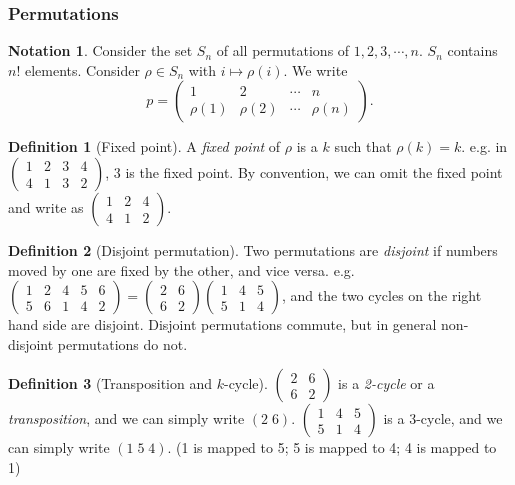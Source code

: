 \documentclass[a4paper]{article}
\theoremstyle{definition}
\newtheorem*{defi}{Definition}
\newtheorem*{notation}{Notation}
\begin{document}
\subsubsection{Permutations}

\begin{notation}
  Consider the set $S_n$ of all permutations of $1, 2, 3, \cdots , n$. $S_n$ contains $n!$ elements. Consider $\rho\in S_n$ with $i \mapsto \rho(i)$. We write
\[
p = \begin{pmatrix} 1 & 2 & \cdots & n\\ \rho(1) & \rho (2) &\cdots & \rho (n)\end{pmatrix}.
\]
\end{notation}

\begin{defi}[Fixed point]
  A \emph{fixed point} of $\rho$ is a $k$ such that $\rho(k) = k$. e.g. in $\begin{pmatrix} 1 & 2 & 3 & 4\\4 & 1 & 3 & 2\end{pmatrix}$, $3$ is the fixed point. By convention, we can omit the fixed point and write as $\begin{pmatrix} 1 & 2 & 4\\ 4 & 1 & 2\end{pmatrix}$.
\end{defi}

\begin{defi}[Disjoint permutation]
  Two permutations are \emph{disjoint} if numbers moved by one are fixed by the other, and vice versa.  e.g. $\begin{pmatrix} 1 & 2 & 4 & 5 & 6\\ 5 & 6 & 1 & 4 & 2\end{pmatrix} = \begin{pmatrix}2 & 6\\ 6& 2\end{pmatrix}\begin{pmatrix}1 & 4 & 5\\5 & 1 & 4\end{pmatrix}$, and the two cycles on the right hand side are disjoint. Disjoint permutations commute, but in general non-disjoint permutations do not.
\end{defi}

\begin{defi}[Transposition and $k$-cycle]
  $\begin{pmatrix} 2 & 6 \\ 6 & 2\end{pmatrix}$ is a \emph{2-cycle} or a \emph{transposition}, and we can simply write $(2\; 6)$. $\begin{pmatrix}1 & 4 & 5\\5 & 1 & 4\end{pmatrix}$ is a 3-cycle, and we can simply write $(1\; 5\; 4)$. (1 is mapped to 5; 5 is mapped to 4; 4 is mapped to 1)
\end{defi}
\end{document}
